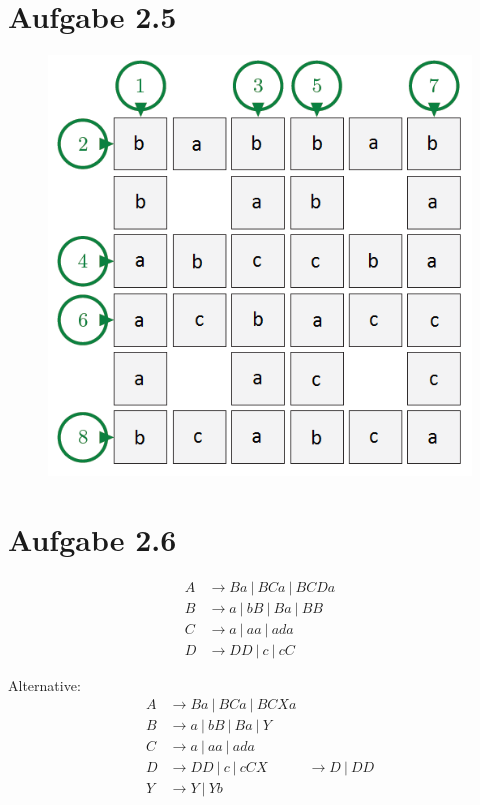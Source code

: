 \documentclass{article}
\begin{document}
\newpage
\section{Aufgabe 2.5}
\begin{figure}[h]
  \includegraphics[width=\textwidth]{crossword.png}
\end{figure}

\section{Aufgabe 2.6}
\begin{align*}
A &\rightarrow Ba\ |\ BCa\ |\ BCDa \\
B &\rightarrow a\  |\ bB\  |\ Ba\  |\ BB \\ 
C &\rightarrow a\  |\ aa\  |\ ada  \\
D &\rightarrow DD\ |\ c\   |\ cC   
\end{align*}

Alternative:
\begin{align*}
A &\rightarrow Ba\ |\ BCa\ |\ BCXa \\
B &\rightarrow a\  |\ bB\  |\ Ba\  |\ Y \\
C &\rightarrow a\  |\ aa\  |\ ada  \\
D &\rightarrow DD\ |\ c\   |\ cC
X &\rightarrow D\ |\ DD \\
Y &\rightarrow Y\ |\ Yb
\end{align*}
\end{document}
